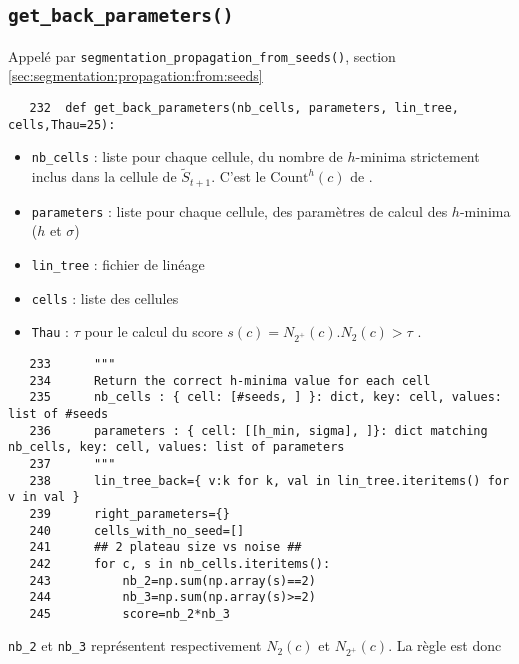 \documentclass{article}
\def \mycolor {red}
\begin{document}
\subsection{\texttt{get\_back\_parameters()}}
\label{sec:get:back:parameters}
\color{\mycolor}
Appel\'e par \texttt{segmentation\_propagation\_from\_seeds()},
section \ref{sec:segmentation:propagation:from:seeds}
\color{black}
\begin{verbatim}
   232	def get_back_parameters(nb_cells, parameters, lin_tree, cells,Thau=25):
\end{verbatim} 
\color{\mycolor}
\begin{itemize}
\itemsep -1ex
\item \verb|nb_cells| : liste pour chaque cellule, du nombre de $h$-minima strictement inclus dans la cellule de  $\tilde{S}_{t+1}$. C'est le $\mathrm{Count}^{h}(c)$ de \cite[section 2.3.3.5, page 71]{guignard:tel-01278725}.
\item \verb|parameters| : liste pour chaque cellule,  des param\`etres de calcul des $h$-minima ($h$ et $\sigma$)
\item \verb|lin_tree| : fichier de lin\'eage
\item \verb|cells| : liste des cellules
\item \verb|Thau| : $\tau$ pour le calcul du score $s(c) = N_{2^{+}}(c) . N_2(c) > \tau$ \cite[page 72]{guignard:tel-01278725}.
\end{itemize}
\color{black}
\begin{verbatim}
   233	    """
   234	    Return the correct h-minima value for each cell
   235	    nb_cells : { cell: [#seeds, ] }: dict, key: cell, values: list of #seeds
   236	    parameters : { cell: [[h_min, sigma], ]}: dict matching nb_cells, key: cell, values: list of parameters
   237	    """
   238	    lin_tree_back={ v:k for k, val in lin_tree.iteritems() for v in val }
   239	    right_parameters={}
   240	    cells_with_no_seed=[]
   241	    ## 2 plateau size vs noise ##
   242	    for c, s in nb_cells.iteritems():
   243	        nb_2=np.sum(np.array(s)==2)
   244	        nb_3=np.sum(np.array(s)>=2)
   245	        score=nb_2*nb_3
\end{verbatim} 
\color{\mycolor}
\verb|nb_2| et \verb|nb_3| repr\'esentent respectivement $N_2(c)$ et $N_{2^{+}}(c)$. La r\`egle est donc
\end{document}
